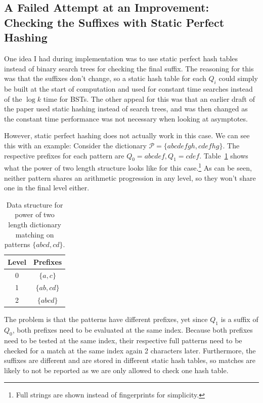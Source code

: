 \documentclass[ %
                    author={Dominic Joseph Moylett},
                    degree={MEng},
                     title={Dictionary Matching with Fingerprints},
                  subtitle={An Empirical Analysis},
                      type={research},
                      year={2015} ]{dissertation}
\begin{document}
\subsection{A Failed Attempt at an Improvement: Checking the Suffixes with Static Perfect Hashing}
\label{ssec:static-hash-fail}

One idea I had during implementation was to use static perfect hash tables instead of binary search trees for checking the final suffix. The reasoning for this was that the suffixes don't change, so a static hash table for each $Q_i$ could simply be built at the start of computation and used for constant time searches instead of the $\log k$ time for BSTs. The other appeal for this was that an earlier draft of the paper used static hashing instead of search trees, and was then changed as the constant time performance was not necessary when looking at asymptotes.

However, static perfect hashing does not actually work in this case. We can see this with an example: Consider the dictionary $\mathcal{P} = \{abcdefgh, cdefhg\}$. The respective prefixes for each pattern are $Q_0 = abcdef, Q_1 = cdef$. Table~\ref{tab:static-hash-fail} shows what the power of two length structure looks like for this case.\footnote{Full strings are shown instead of fingerprints for simplicity.} As can be seen, neither pattern shares an arithmetic progression in any level, so they won't share one in the final level either.

\begin{table}[t]
  \centering
  \begin{tabular}{|c|c|}
    \hline
    Level & Prefixes \\\hline
    0 & $\{a, c\}$ \\\hline
    1 & $\{ab, cd\}$ \\\hline
    2 & $\{abcd\}$ \\\hline
  \end{tabular}
  \caption{Data structure for power of two length dictionary matching on patterns $\{abcd, cd\}$.}
  \label{tab:static-hash-fail}
\end{table}

The problem is that the patterns have different prefixes, yet since $Q_1$ is a suffix of $Q_0$, both prefixes need to be evaluated at the same index. Because both prefixes need to be tested at the same index, their respective full patterns need to be checked for a match at the same index again 2 characters later. Furthermore, the suffixes are different and are stored in different static hash tables, so matches are likely to not be reported as we are only allowed to check one hash table.
\end{document}
